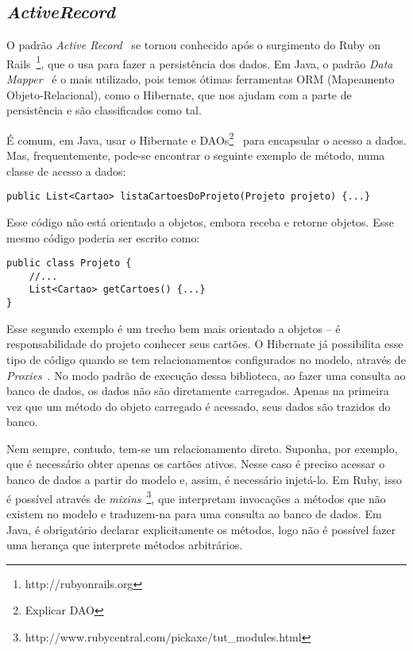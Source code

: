 \subsection{\textit{ActiveRecord}}

O padrão \textit{Active Record}~\cite{fowler} se tornou conhecido após o surgimento do Ruby on Rails~\footnote{http://rubyonrails.org}, que o usa para fazer a persistência dos dados. Em Java, o padrão \textit{Data Mapper}~\cite{fowler} é o mais utilizado, pois temos ótimas ferramentas ORM (Mapeamento Objeto-Relacional), como o Hibernate, que nos ajudam com a parte de persistência e são classificados como tal.

É comum, em Java, usar o Hibernate e DAOs\footnote{Explicar DAO}~\cite{dao} para encapsular o acesso a dados. Mas, frequentemente, pode-se encontrar o seguinte exemplo de método, numa classe de acesso a dados:

\begin{lstlisting}
public List<Cartao> listaCartoesDoProjeto(Projeto projeto) {...}
\end{lstlisting}

Esse código não está orientado a objetos, embora receba e retorne objetos. Esse mesmo código poderia ser escrito como:

\begin{lstlisting}
public class Projeto {
	//...
	List<Cartao> getCartoes() {...}
}
\end{lstlisting}

Esse segundo exemplo é um trecho bem mais orientado a objetos -- é responsabilidade do projeto conhecer seus cartões. O Hibernate já possibilita esse tipo de código quando se tem relacionamentos configurados no modelo, através de \textit{Proxies}~\cite{gof}. No modo padrão de execução dessa biblioteca, ao fazer uma consulta ao banco de dados, os dados não são diretamente carregados. Apenas na primeira vez que um método do objeto carregado é acessado, seus dados são trazidos do banco. 

Nem sempre, contudo, tem-se um relacionamento direto. Suponha, por exemplo, que é necessário obter apenas os cartões ativos. Nesse caso é preciso acessar o banco de dados a partir do modelo e, assim, é necessário injetá-lo. Em Ruby, isso é possível através de \textit{mixins}~\footnote{http://www.rubycentral.com/pickaxe/tut\_modules.html}, que interpretam invocações a métodos que não existem no modelo e traduzem-na para uma consulta ao banco de dados. Em Java, é obrigatório declarar explicitamente os métodos, logo não é possível fazer uma herança que interprete métodos arbitrários.

